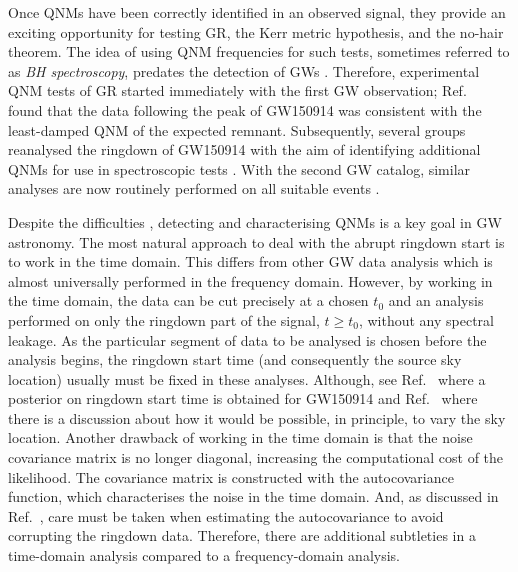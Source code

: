 Once QNMs have been correctly identified in an observed signal, they provide an exciting opportunity for testing GR, the Kerr metric hypothesis, and the no-hair theorem. 
The idea of using QNM frequencies for such tests, sometimes referred to as \emph{BH spectroscopy}, predates the detection of GWs \cite{Dreyer:2003bv, Berti:2005ys, Berti:2007zu}.
Therefore, experimental QNM tests of GR started immediately with the first GW observation; Ref.~\cite{LIGOScientific:2016lio} found that the data following the peak of GW150914 was consistent with the least-damped QNM of the expected remnant.
Subsequently, several groups reanalysed the ringdown of GW150914 with the aim of identifying additional QNMs for use in spectroscopic tests \cite{Carullo:2019flw, Isi:2019aib, Brito:2018rfr}. 
With the second GW catalog, similar analyses are now routinely performed on all suitable events \cite{LIGOScientific:2020tif}.


Despite the difficulties , detecting and characterising QNMs is a key goal in GW astronomy. 
The most natural approach to deal with the abrupt ringdown start is to work in the time domain. 
This differs from other GW data analysis which is almost universally performed in the frequency domain. 
However, by working in the time domain, the data can be cut precisely at a chosen $t_0$ and an analysis performed on only the ringdown part of the signal, $t \geq t_0$, without any spectral leakage.
As the particular segment of data to be analysed is chosen before the analysis begins, the ringdown start time (and consequently the source sky location) usually must be fixed in these analyses. 
Although, see Ref.~\cite{Carullo:2019flw} where a posterior on ringdown start time is obtained for GW150914 and Ref.~\cite{Isi:2021iql} where there is a discussion about how it would be possible, in principle, to vary the sky location.
Another drawback of working in the time domain is that the noise covariance matrix is no longer diagonal, increasing the computational cost of the likelihood. 
The covariance matrix is constructed with the autocovariance function, which characterises the noise in the time domain.
And, as discussed in Ref.~\cite{Isi:2021iql}, care must be taken when estimating the autocovariance to avoid corrupting the ringdown data. Therefore, there are additional subtleties in a time-domain analysis compared to a frequency-domain analysis.

